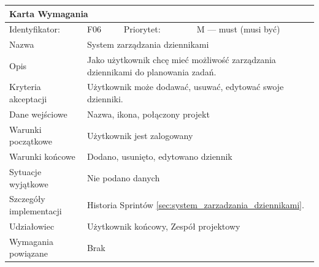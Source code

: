 \documentclass[a4paper,11pt]{report}
\begin{document}
		\begin{tabular}{|p{3cm}|p{2cm}|p{2cm}|p{6cm}|}
		\hline
		\multicolumn{4}{|p{12 cm}|}{Karta Wymagania}\\
		\hline
		Identyfikator: & F06 & Priorytet: & M — must (musi być)\\
		\hline
		Nazwa & \multicolumn{3}{|p{10 cm}|}{System zarządzania dziennikami}\\
		\hline
		Opis & \multicolumn{3}{|p{10 cm}|}{Jako użytkownik chcę mieć możliwość zarządzania dziennikami do planowania zadań.}\\
		\hline
		Kryteria akceptacji & \multicolumn{3}{|p{10 cm}|}{Użytkownik może dodawać, usuwać, edytować swoje dzienniki.}\\
		\hline
		Dane wejściowe & \multicolumn{3}{|p{10 cm}|}{Nazwa, ikona, połączony projekt}\\
		\hline
		Warunki początkowe & \multicolumn{3}{|p{10 cm}|}{Użytkownik jest zalogowany}\\
		\hline
		Warunki końcowe & \multicolumn{3}{|p{10 cm}|}{Dodano, usunięto, edytowano dziennik}\\
		\hline
		Sytuacje wyjątkowe & \multicolumn{3}{|p{10 cm}|}{Nie podano danych}\\
		\hline
		Szczegóły implementacji & \multicolumn{3}{|p{10 cm}|}{Historia Sprintów \ref{sec:system_zarzadzania_dziennikami}.}\\
		\hline
		Udziałowiec & \multicolumn{3}{|p{10 cm}|}{Użytkownik końcowy, Zespół projektowy}\\
		\hline
		Wymagania powiązane & \multicolumn{3}{|p{10 cm}|}{Brak}\\
		\hline
		\end{tabular}\\
		\newline
		\vspace*{0,2 cm}
		\newline
\end{document}
